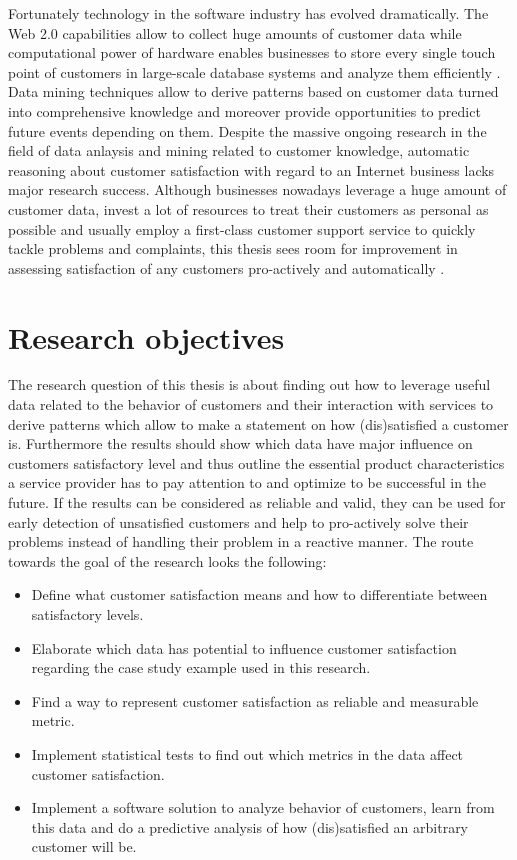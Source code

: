 Fortunately technology in the software industry has evolved dramatically. The Web 2.0 capabilities allow to collect huge amounts of customer data while computational power of hardware enables businesses to store every single touch point of customers in large-scale database systems and analyze them efficiently \cite{chen2003understanding} \cite{neckel2015}. Data mining techniques allow to derive patterns based on customer data turned into comprehensive knowledge and moreover provide opportunities to predict future events depending on them. Despite the massive ongoing research in the field of data anlaysis and mining related to customer knowledge, automatic reasoning about customer satisfaction with regard to an Internet business lacks major research success. Although businesses nowadays leverage a huge amount of customer data, invest a lot of resources to treat their customers as personal as possible and usually employ a first-class customer support service to quickly tackle problems and complaints, this thesis sees room for improvement in assessing satisfaction of any customers pro-actively and automatically \cite{neckel2015}.

\section{Research objectives}
The research question of this thesis is about finding out how to leverage useful data related to the behavior of customers and their interaction with services to derive patterns which allow to make a statement on how (dis)satisfied a customer is. Furthermore the results should show which data have major influence on customers satisfactory level and thus outline the essential product characteristics a service provider has to pay attention to and optimize to be successful in the future. If the results can be considered as reliable and valid, they can be used for early detection of unsatisfied customers and help to pro-actively solve their problems instead of handling their problem in a reactive manner.
The route towards the goal of the research looks the following:

\begin{itemize}
	\item Define what customer satisfaction means and how to differentiate between satisfactory levels.
	\item Elaborate which data has potential to influence customer satisfaction regarding the case study example used in this research. 
	\item Find a way to represent customer satisfaction as reliable and measurable metric.
	\item Implement statistical tests to find out which metrics in the data affect customer satisfaction. 
	\item Implement a software solution to analyze behavior of customers, learn from this data and do a predictive analysis of how (dis)satisfied an arbitrary customer will be.
\end{itemize}

